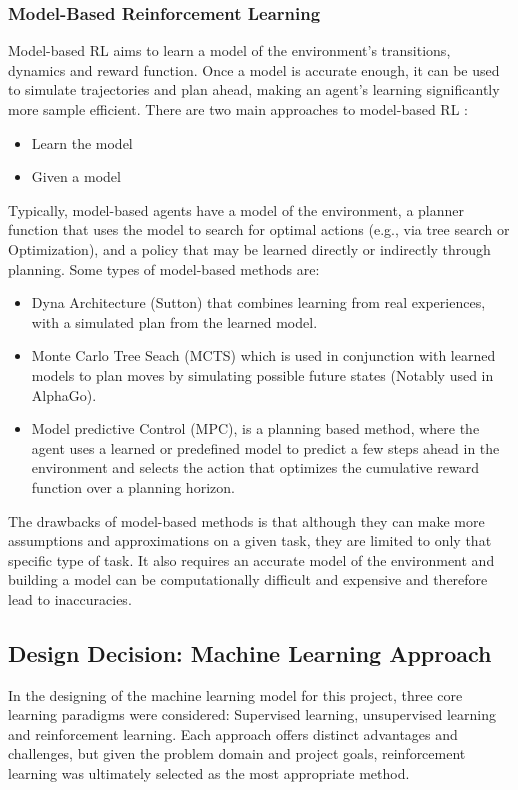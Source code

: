 \subsubsection{Model-Based Reinforcement Learning}
Model-based RL aims to learn a model of the environment's transitions, dynamics %
and reward function. Once a model is accurate enough, it can be used to 
simulate trajectories and plan ahead, making an agent's learning significantly more
sample efficient. There are two main approaches to model-based RL \cite{ReinforcementLearning}:
\begin{itemize}
      \item Learn the model %
      \item Given a model
\end{itemize}
Typically, model-based agents have a model of the environment, a planner function that uses
the model to search for optimal actions (e.g., via tree search or Optimization), and a policy
that may be learned directly or indirectly through planning.
Some types of model-based methods are:
\begin{itemize}
      \item Dyna Architecture (Sutton) that combines learning from real experiences, 
      with a simulated plan from the learned model.
      \item Monte Carlo Tree Seach (MCTS) which is used in conjunction with learned models
      to plan moves by simulating possible future states (Notably used in AlphaGo). \cite{ReinforcementLearning}
      \item Model predictive Control (MPC), is a planning based method, where the agent
      uses a learned or predefined model to predict a few steps ahead in the environment and 
      selects the action that optimizes the cumulative reward function over a planning horizon. \cite{Types-of-Reinforcement-Learning} 
\end{itemize}
The drawbacks of model-based methods is that although they can make more assumptions
and approximations on a given task, they are limited to only that specific 
type of task. It also requires an accurate model of the environment and building a model
can be computationally difficult and expensive and therefore lead to inaccuracies. \cite{Types-of-Reinforcement-Learning}

\subsection{Design Decision: Machine Learning Approach}
\label{sec:ML-Design-Decision}
In the designing of the machine learning model for this project, three core learning paradigms
were considered: Supervised learning, unsupervised learning and reinforcement learning. Each 
approach offers distinct advantages and challenges, but given the problem domain and 
project goals, reinforcement learning was ultimately selected as the most appropriate method.

